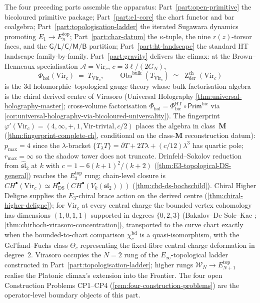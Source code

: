 \documentclass[11pt]{memoir}
\DeclareMathOperator{\Obs}{Obs}
\providecommand{\cref}[1]{\ref{#1}}
\newcommand{\cA}{\mathcal{A}}
\providecommand{\fsl}{\mathfrak{sl}}
\providecommand{\cW}{\mathcal{W}}
\providecommand{\ChirHoch}{CH}
\providecommand{\Zderch}{\operatorname{Z}^{\mathrm{ch}}_{\mathrm{der}}}
\providecommand{\Phihol}{\Phi_{\mathrm{hol}}}
\begin{document}
\noindent
The four preceding parts assemble the apparatus: Part~\ref{part:open-primitive}
the bicoloured primitive package; Part~\ref{part:e1-core} the
chart functor and bar coalgebra; Part~\ref{part:topologisation-ladder}
the iterated Sugawara dynamics promoting $E_1 \to E_n^{\mathrm{top}}$;
Part~\ref{part:char-datum} the $\kappa$-tuple, the nine
$r(z)$-torsor faces, and the $\mathsf{G/L/C/M/B}$ partition;
Part~\ref{part:ht-landscape} the standard HT landscape
family-by-family. Part~\ref{part:gravity} delivers the climax: at
the Brown--Henneaux specialisation
$\cA = \mathrm{Vir}_c$, $c = 3\ell/(2G_N)$,
\[
\boxed{\;
\Phihol(\mathrm{Vir}_c) \;=\; T_{\mathrm{Vir}_c},
\qquad
\Obs^{\mathrm{bulk}}(T_{\mathrm{Vir}_c})
 \;\simeq\;
 \Zderch(\mathrm{Vir}_c)
\;}
\]
is the $3$d holomorphic--topological gauge theory whose bulk
factorisation algebra is the chiral derived centre of Virasoro
(Universal Holography
\cref{thm:universal-holography-master}; cross-volume factorisation
$\Phihol = \Phi^{\mathrm{HT}}_{\mathrm{bic}} \circ
\mathsf{Prim}^{\mathrm{bic}}$ via
\cref{cor:universal-holography-via-bicoloured-universality}).
The fingerprint $\varphi'(\mathrm{Vir}_c) =
(4, \infty, +, 1, \mathrm{Vir}\text{-trivial}, c/2)$ places the
algebra in class~$\mathbf{M}$
\textup(\cref{thm:fingerprint-complete-ch}\textup, conditional on the
class-\(\mathbf M\) reconstruction datum\textup): $p_{\max} = 4$
since the $\lambda$-bracket
$\{T_\lambda T\} = \partial T + 2 T \lambda + (c/12) \lambda^3$
has quartic pole; $r_{\max} = \infty$ so the shadow tower does
not truncate. Drinfeld--Sokolov reduction from
$\widehat{\fsl}_2$ at $k$ with $c = 1 - 6(k+1)^2/(k+2)$
\textup(\cref{thm:E3-topological-DS-general}\textup) reaches
the $E_3^{\mathrm{top}}$ rung; chain-level closure is
$\ChirHoch^\bullet(\mathrm{Vir}_c) \simeq
H^\bullet_{\mathrm{DS}}(\ChirHoch^\bullet(V_k(\fsl_2)))$
\textup(\cref{thm:chd-ds-hochschild}\textup). Chiral Higher Deligne
supplies the $E_3$-chiral brace action on the derived centre
\textup(\cref{thm:chiral-higher-deligne}\textup); for $\mathrm{Vir}_c$
at every central charge the bounded vertex cohomology has
dimensions $(1, 0, 1, 1)$ supported in degrees $\{0, 2, 3\}$
\textup(Bakalov--De Sole--Kac \cite{BDSK21};
\cref{thm:chirhoch-virasoro-concentration}\textup), transported to
the curve chart exactly when the bounded-to-chart comparison
$\chi_c^{\mathrm{bd}}$ is a quasi-isomorphism, with
the Gel'fand--Fuchs class $\Theta_c$ representing the fixed-fibre
central-charge deformation in degree~$2$. Virasoro occupies the $N = 2$ rung of the
$E_\infty$-topological ladder constructed in
Part~\ref{part:topologisation-ladder}; higher rungs
$\cW_N \to E_{N+1}^{\mathrm{top}}$ realise the Platonic climax's
extension into the Frontier. The four open Construction Problems
CP1--CP4 \textup(\cref{rem:four-construction-problems}\textup)
are the operator-level boundary objects of this part.
\end{document}
